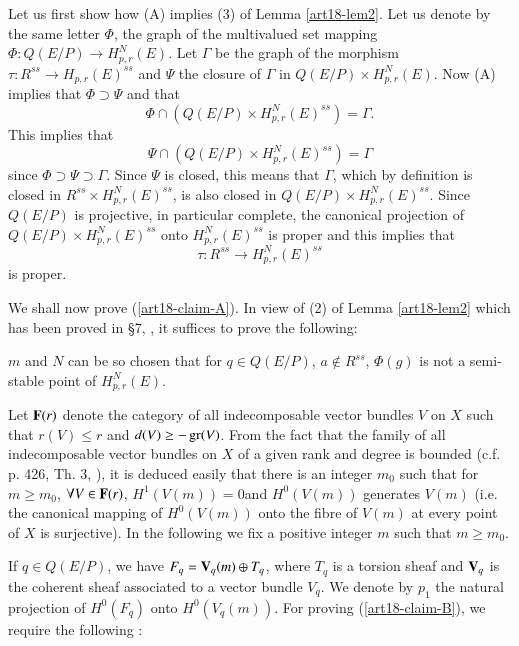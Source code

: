 Let us first show how (A) implies (3) of Lemma \ref{art18-lem2}. Let us denote by the same letter $\Phi$, the graph of the multivalued set mapping $\Phi:Q(E/P)\to H^{N}_{p,r}(E)$. Let $\Gamma$ be the graph of the morphism $\tau :R^{ss}\to H_{p,r}(E)^{ss}$ and $\Psi$ the closure of $\Gamma$ in $Q(E/P)\times H^{N}_{p,r}(E)$. Now (A) implies that $\Phi\supset \Psi$ and that
$$
\Phi\cap (Q(E/P)\times H^{N}_{p,r}(E)^{ss})=\Gamma.
$$
This implies that
$$
\Psi \cap (Q(E/P)\times H^{N}_{p,r}(E)^{ss})=\Gamma
$$
since $\Phi\supset \Psi\supset \Gamma$. Since $\Psi$ is closed, this means that $\Gamma$, which by definition is closed in $R^{ss}\times H^{N}_{p,r}(E)^{ss}$, is also closed in $Q(E/P)\times H^{N}_{p,r}(E)^{ss}$. Since $Q(E/P)$ is projective, in particular complete, the canonical projection of $Q(E/P)\times H^{N}_{p,r}(E)^{ss}$ onto $H^{N}_{p,r}(E)^{ss}$ is proper and this implies that
$$
\tau :R^{ss}\to H^{N}_{p,r}(E)^{ss}
$$
is proper.

We shall now prove (\ref{art18-claim-A}). In view of (2) of Lemma \ref{art18-lem2} which has been proved in \S7, \cite{art18-key12}, it suffices to prove the following:

\begin{alphaclaim}\label{art18-claim-B}
$m$ and $N$ can be so chosen that for $q\in Q(E/P)$, $a\not\in R^{ss}$, $\Phi(g)$ is not a semi-stable point of $H^{N}_{p,r}(E)$.
\end{alphaclaim}

Let $\mathbf{F}(r)$ denote the category of all indecomposable vector bundles $V$ on $X$ such that $r(V)\leq r$ and $d(V)\geq -\operatorname{\mathrm{gr}} (V)$. From the fact that the family of all indecomposable vector bundles on $X$ of a given rank and degree is bounded (c.f. p. 426, Th. 3, \cite{art18-key1}), it is deduced easily that there is an integer $m_{0}$ such that for $m\geq m_{0}$, $\forall V\in \mathbf{F}(r)$, $H^{1}(V(m))=0$\pageoriginale and $H^{0}(V(m))$ generates $V(m)$ (i.e. the canonical mapping of $H^{0}(V(m))$ onto the fibre of $V(m)$ at every point of $X$ is surjective). In the following we fix a positive integer $m$ such that $m\geq m_{0}$.

If $q\in Q(E/P)$, we have $F_{q}=\mathbf{V}_{q}(m)\oplus T_{q}$, where $T_{q}$ is a torsion sheaf and $\mathbf{V}_{q}$ is the coherent sheaf associated to a vector bundle $V_{q}$. We denote by $p_{1}$ the natural projection of $H^{0}(F_{q})$ onto $H^{0}(V_{q}(m))$. For proving (\ref{art18-claim-B}), we require the following :

